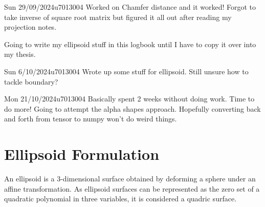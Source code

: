\documentclass{project-logbook}
\begin{document}
	\begin{MeetingMinutes}{Sun 29/09/2024}{u7013004}
		Worked on Chamfer distance and it worked! Forgot to take inverse of square root matrix but figured it all out after reading my projection notes.

		Going to write my ellipsoid stuff in this logbook until I have to copy it over into my thesis.


	\end{MeetingMinutes}

	\begin{MeetingMinutes}{Sun 6/10/2024}{u7013004}
		Wrote up some stuff for ellipsoid. Still unsure how to tackle boundary?
	\end{MeetingMinutes}

	\begin{MeetingMinutes}{Mon 21/10/2024}{u7013004}
		Basically spent 2 weeks without doing work. Time to do more! Going to attempt the alpha shapes approach. Hopefully converting back and forth from tensor to numpy won't do weird things.
	\end{MeetingMinutes}

\section{Ellipsoid Formulation} \label{sec:ellipsoid}
An ellipsoid is a 3-dimensional surface obtained by deforming a sphere under an affine transformation. As ellipsoid surfaces can be represented as the zero set of a quadratic polynomial in three variables, it is considered a quadric surface.
\end{document}
